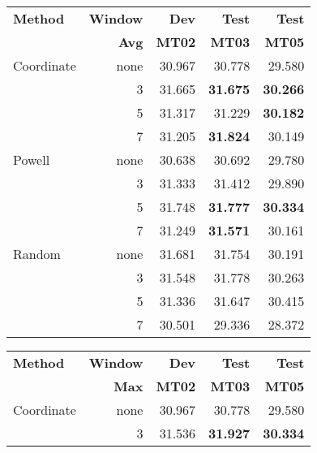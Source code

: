 \documentclass[11pt,tightenlines,kern-1pt]{article}
\begin{document}
 

\begin{table*}[htb!]
\begin{tabular}{|l|rrrr|}
\hline \bf Method  & \bf Window & \bf Dev & \bf Test & \bf Test \\
                   & \bf Avg    & \bf MT02 & \bf MT03 & \bf MT05 \\ \hline
Coordinate & none &  30.967 & 30.778 & 29.580 \\
           & 3  & 31.665  & {\bf 31.675}  & {\bf 30.266} \\
           & 5  & 31.317  & 31.229  & {\bf 30.182}  \\
           & 7  & 31.205  & {\bf 31.824}  & 30.149 \\ \hline
Powell     & none & 30.638 & 30.692  & 29.780 \\ 
           & 3  & 31.333  & 31.412  & 29.890 \\
           & 5  & 31.748  & {\bf 31.777} &  {\bf 30.334} \\
           & 7  & 31.249  & {\bf 31.571} &  30.161 \\ \hline
Random     & none & 31.681 & 31.754 & 30.191 \\
           & 3  & 31.548  & 31.778  & 30.263 \\
           & 5  & 31.336  & 31.647  & 30.415  \\
           & 7  & 30.501  & 29.336  & 28.372 \\
\hline
\end{tabular}
\begin{tabular}{|l|rrrr|}
\hline \bf Method  & \bf Window & \bf Dev & \bf Test & \bf Test \\
                   & \bf Max    & \bf MT02 & \bf MT03 & \bf MT05 \\ \hline
Coordinate & none &  30.967 & 30.778 & 29.580 \\
           & 3  & 31.536  & {\bf 31.927} & {\bf 30.334} \\

\end{tabular}
\end{table*}
\end{document}
